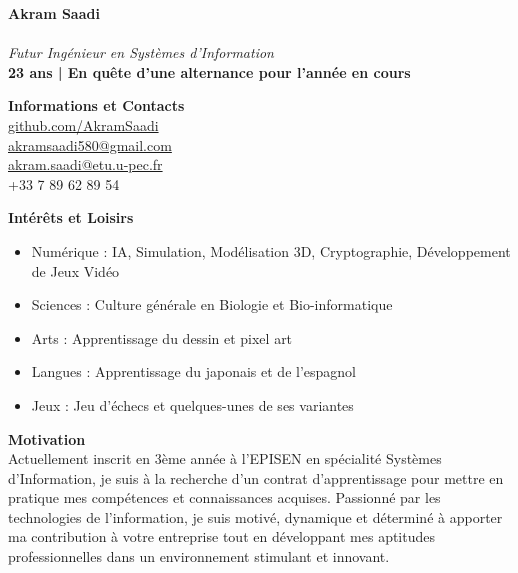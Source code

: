 \documentclass[a4paper,11pt]{article}
\newcommand{\cvsection}[1]{\vspace{1em}\noindent\textbf{\textcolor{cvhighlight}{\LARGE #1}}\vspace{0.5em}\\}
\newcommand{\cvitem}[1]{\item #1}
\begin{document}
\begin{paracol}{2}

\begin{minipage}[t]{\linewidth}
\colorbox{sectionbg1}{
    \parbox{\linewidth}{
        \vspace{0.25em}
        {\fontsize{24}{28}\selectfont \textbf{Akram Saadi}\\\\}
        \fontsize{12}{14}\selectfont\faUserGraduate \hspace{0.5em}\textit{Futur Ingénieur en Systèmes d'Information} \\
        \textbf{23 ans | En quête d'une alternance pour l'année en cours}
        \vspace{0.25em}
    }
}
\medskip
\colorbox{sectionbg2}{
    \parbox{\linewidth}{
        \cvsection{\faAddressCard \hspace{0.5em} Informations et Contacts}
        \faGithub \hspace{0.5em} \href{https://github.com/AkramSaadi}{github.com/AkramSaadi} \\
        \faEnvelope \hspace{0.5em} \href{mailto:akramsaadi580@gmail.com}{akramsaadi580@gmail.com} \\
        \faEnvelopeOpen \hspace{0.5em} \href{mailto:akram.saadi@etu.u-pec.fr}{akram.saadi@etu.u-pec.fr} \\
        \faPhone \hspace{0.5em} +33 7 89 62 89 54
    }
}
\end{minipage}
\smallskip

\colorbox{sectionbg1}{
    \parbox{\linewidth}{
        \cvsection{\faHeart \hspace{0.5em} Intérêts et Loisirs}
        \vspace{-1em}
        \begin{itemize}[leftmargin=0.5cm, itemsep=0pt, topsep=0pt]
            \cvitem{Numérique : IA, Simulation, Modélisation 3D, Cryptographie, Développement de Jeux Vidéo}
            \cvitem{Sciences : Culture générale en Biologie et Bio-informatique}
            \cvitem{Arts : Apprentissage du dessin et pixel art}
            \cvitem{Langues : Apprentissage du japonais et de l'espagnol}
            \cvitem{Jeux : Jeu d'échecs et quelques-unes de ses variantes}
        \end{itemize}
    }
}
\medskip

\colorbox{sectionbg2}{
    \parbox{\linewidth}{
        \cvsection{\faComment \hspace{0.5em} Motivation}
        Actuellement inscrit en 3ème année à l'EPISEN en spécialité Systèmes d'Information, je suis à la recherche d'un contrat d'apprentissage pour mettre en pratique mes compétences et connaissances acquises. Passionné par les technologies de l'information, je suis motivé, dynamique et déterminé à apporter ma contribution à votre entreprise tout en développant mes aptitudes professionnelles dans un environnement stimulant et innovant.
    }
}
\medskip


\end{paracol}
\end{document}
